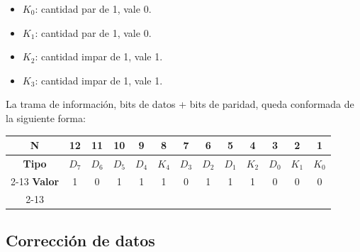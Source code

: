 \begin{itemize}[nosep]
    \item $K_0$: cantidad par de 1, vale 0.
    \item $K_1$: cantidad par de 1, vale 0.
    \item $K_2$: cantidad impar de 1, vale 1.
    \item $K_3$: cantidad impar de 1, vale 1.
\end{itemize}\vspace{5pt}
\noindent{} La trama de información, bits de datos + bits de paridad, queda conformada de la siguiente forma:
\begin{center}
\begin{tabular}{ccccccccccccc}
\rowcolor[HTML]{FFFFC7} 
\cellcolor[HTML]{FCFF2F}\textbf{N}     & 12    & 11    & 10    & 9     & 8     & 7     & 6     & 5     & 4     & 3     & 2     & 1     \\ \hline
\rowcolor[HTML]{CBCEFB} 
\cellcolor[HTML]{9698ED}\textbf{Tipo}  & $D_7$ & $D_6$ & $D_5$ & $D_4$ & $K_4$ & $D_3$ & $D_2$ & $D_1$ & $K_2$ & $D_0$ & $K_1$ & $K_0$ \\ \cline{2-13} 
\rowcolor[HTML]{FFCCC9} 
\cellcolor[HTML]{FD6864}\textbf{Valor} & 1     & 0     & 1     & 1     & 1     & 0     & 1     & 1     & 1     & 0     & 0     & 0     \\ \cline{2-13} 
\end{tabular}
\end{center}

\subsection{Corrección de datos}
